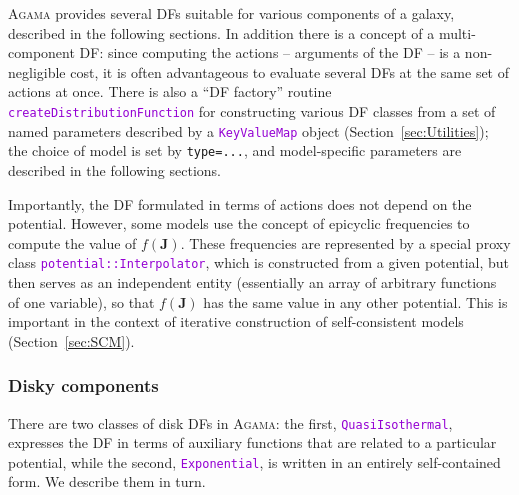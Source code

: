 \documentclass[12pt]{article}
\newcommand{\Agama}{\textsc{Agama}\xspace}
\newcommand{\ttt}[1]{\textcolor{darkviolet}{\texttt{#1}}}
\newcommand{\ppp}[1]{\textcolor{darkolive} {\texttt{#1}}}
\newcommand{\bJ}{\boldsymbol{J}}
\begin{document}
\Agama provides several DFs suitable for various components of a galaxy, described in the following sections. In addition there is a concept of a multi-component DF: since computing the actions -- arguments of the DF -- is a non-negligible cost, it is often advantageous to evaluate several DFs at the same set of actions at once.
There is also a ``DF factory'' routine \ttt{createDistributionFunction} for constructing various DF classes from a set of named parameters described by a \ttt{KeyValueMap} object (Section~\ref{sec:Utilities}); the choice of model is set by \ppp{type=...}, and model-specific parameters are described in the following sections.

Importantly, the DF formulated in terms of actions does not depend on the potential. However, some models use the concept of epicyclic frequencies to compute the value of $f(\bJ)$. These frequencies are represented by a special proxy class \ttt{potential::Interpolator}, which is constructed from a given potential, but then serves as an independent entity (essentially an array of arbitrary functions of one variable), so that $f(\bJ)$ has the same value in any other potential. This is important in the context of iterative construction of self-consistent models (Section~\ref{sec:SCM}).


\subsubsection{Disky components}  \label{sec:DFdisk}

There are two classes of disk DFs in \Agama: the first, \ttt{QuasiIsothermal}, expresses the DF in terms of auxiliary functions that are related to a particular potential, while the second, \ttt{Exponential}, is written in an entirely self-contained form. We describe them in turn.
\end{document}
